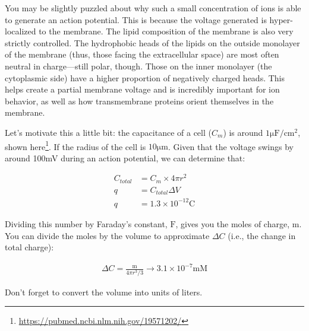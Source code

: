You may be slightly puzzled about why such a small concentration of ions is able to generate an action potential. This is because the voltage generated is hyper-localized to the membrane. The lipid composition of the membrane is also very strictly controlled. The hydrophobic heads of the lipids on the outside monolayer of the membrane (thus, those facing the extracellular space) are most often neutral in charge---still polar, though. Those on the inner monolayer (the cytoplasmic side) have a higher proportion of negatively charged heads. This helps create a partial membrane voltage and is incredibly important for ion behavior, as well as how transmembrane proteins orient themselves in the membrane.\newline

Let's motivate this a little bit: the capacitance of a cell ($C_m$) is around $1\mathrm{\mu F}/\mathrm{cm}^2$, shown here\footnote{\url{https://pubmed.ncbi.nlm.nih.gov/19571202/}}. If the radius of the cell is $10\mathrm{\mu m}$. Given that the voltage swings by around 100mV during an action potential, we can determine that:


\begin{equation} \label{smallchange1}
\begin{split}
C_{total} &= C_m \times 4\pi r^2\\
q &= C_{total}\Delta V \\
q &= 1.3 \times 10^{-12}\mathrm{C}
\end{split}
\end{equation}

\bigskip

Dividing this number by Faraday's constant, $\mathrm{F}$, gives you the moles of charge, $\mathrm{m}$. You can divide the moles by the volume to approximate $\Delta C$ (i.e., the change in total charge):

\begin{equation} \label{eq8}
\begin{split}
\Delta C = \frac{\mathrm{m}}{4\pi r^3 /3} \rightarrow 3.1 \times 10^{-7} \mathrm{mM}
\end{split}
\end{equation}

Don't forget to convert the volume into units of liters.\newline

